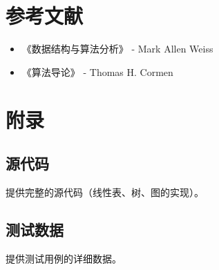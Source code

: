 \documentclass{article}
\begin{document}
\section{参考文献}
\begin{itemize}
    \item 《数据结构与算法分析》 - Mark Allen Weiss
    \item 《算法导论》 - Thomas H. Cormen
\end{itemize}

\section{附录}
\subsection{源代码}
提供完整的源代码（线性表、树、图的实现）。

\subsection{测试数据}
提供测试用例的详细数据。
\end{document}
